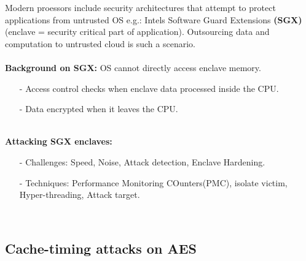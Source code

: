 Modern proessors include security architectures that attempt to protect applications from untrusted OS e.g.: Intels Software Guard Extensions \textbf{(SGX)} (enclave = security critical part of application). Outsourcing data and computation to untrusted cloud is such a scenario.\\
\\
\textbf{Background on SGX:} OS cannot directly access enclave memory.
\begin{itemize}
    \item[-] Access control checks when enclave data processed inside the CPU.
    \item[-] Data encrypted when it leaves the CPU.
\end{itemize}{}
\\
\textbf{Attacking SGX enclaves: }
\begin{itemize}
    \item[-]Challenges: Speed, Noise, Attack detection, Enclave Hardening.
    \item[-]Techniques: Performance Monitoring COunters(PMC), isolate victim, Hyper-threading, Attack target.
\end{itemize}
\\
\subsection{Cache-timing attacks on AES}

